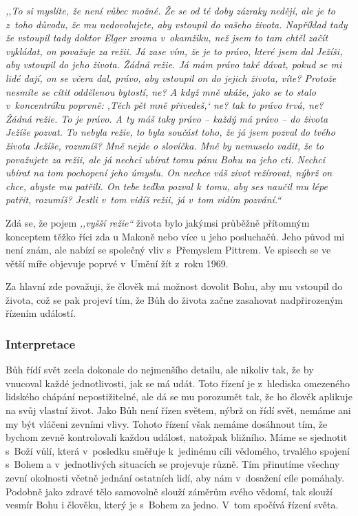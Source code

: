 \begin{enumerate}
{\textit{%
,,To si myslíte, že není vůbec možné. Že se od té doby zázraky nedějí, ale
je to z~toho důvodu, že mu nedovolujete, aby vstoupil do vašeho života.
Například tady že vstoupil tady doktor Elger zrovna v~okamžiku, než jsem to tam
chtěl začít vykládat, on považuje za režii. Já zase vím, že je to právo, které jsem
dal Ježíši, aby vstoupil do jeho života. Žádná režie. Já mám právo také dávat,
pokud se mi lidé dají, on se včera dal, právo, aby vstoupil on do jejich života,
víte? Protože nesmíte se cítit oddělenou bytostí, ne? A když mně ukáže, jako se
to stalo v~koncentráku poprvně: ,Těch pět mně přivedeš,` ne? tak to právo trvá,
ne? Žádná režie. To je právo. A ty máš taky právo -- každý má právo -- do života Ježíše
pozvat. To nebyla režie, to byla součást toho, že já jsem pozval do tvého
života Ježíše, rozumíš? Mně nejde o slovíčka. Mně by nemuselo vadit, že to
považujete za režii, ale já nechci ubírat tomu pánu Bohu na jeho cti. Nechci
ubírat na tom pochopení jeho úmyslu. On nechce váš zivot režírovat, nýbrž on
chce,
abyste mu patřili. On tebe teďka pozval k~tomu, aby ses naučil mu lépe patřit,
rozumíš? Jestli v~tom vidíš režii, já v~tom vidím pozvání.``
}

Zdá se, že pojem \textit{,,vyšší režie``} života bylo jakýmsi průběžně přítomným
konceptem těžko říci zda u Makoně nebo více u jeho posluchačů. Jeho původ mi
není znám, ale nabízí se společný vliv s~Přemyslem Pittrem\cite{matous2014premysl}.
Ve spisech se ve větší míře objevuje poprvé v~Umění žít\cite{KaMaUZ} z~roku 1969.

Za hlavní zde považuji, že člověk má možnost dovolit Bohu, aby mu vstoupil do
života, což se pak projeví tím, že Bůh do života začne zasahovat
nadpřirozeným řízením událostí.

}

\end{enumerate}

\subsubsection*{Interpretace}

Bůh řídí svět zcela dokonale do nejmenšího detailu, ale nikoliv tak, že by
vnucoval každé jednotlivosti, jak se má udát. Toto řízení je z~hlediska
omezeného lidského chápání nepostižitelné, ale dá se mu porozumět tak, že ho
člověk aplikuje na svůj vlastní život. Jako Bůh není řízen světem, nýbrž on řídí
svět, nemáme ani my být vláčeni zevními vlivy. Tohoto řízení však nemáme
dosáhnout tím, že bychom zevně kontrolovali každou událost, natožpak bližního.
Máme se sjednotit s~Boží vůlí, která v~posledku směřuje k~jedinému cíli
vědomého, trvalého spojení s~Bohem a v~jednotlivých situacích se projevuje
různě. Tím přinutíme všechny zevní okolnosti včetně jednání ostatních lidí, aby
nám v~dosažení cíle pomáhaly. Podobně jako zdravé tělo samovolně slouží záměrům
svého vědomí, tak slouží vesmír Bohu i člověku, který je s~Bohem za jedno. V~tom
spočívá řízení světa.

